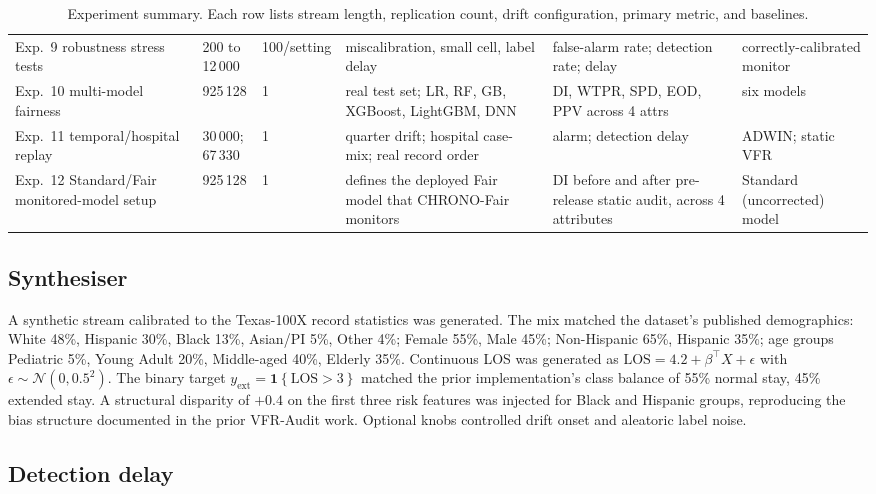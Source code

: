 \documentclass[acmsmall,nonacm,review,anonymous]{acmart}
\newcommand{\1}[1]{\mathbf{1}\!\left\{#1\right\}}
\begin{document}
\begin{table}[t]
{\begin{tabular}{p{2.4cm} p{1.5cm} p{1.6cm} p{3.4cm} p{3.7cm} p{4.6cm}}
Exp.~9 robustness stress tests & 200 to 12\,000 & 100/setting & miscalibration, small cell, label delay & false-alarm rate; detection rate; delay & correctly-calibrated monitor \\
Exp.~10 multi-model fairness & 925\,128 & 1 & real test set; LR, RF, GB, XGBoost, LightGBM, DNN & DI, WTPR, SPD, EOD, PPV across 4 attrs & six models \\
Exp.~11 temporal/hospital replay & 30\,000; 67\,330 & 1 & quarter drift; hospital case-mix; real record order & alarm; detection delay & ADWIN; static VFR \\
Exp.~12 Standard/Fair monitored-model setup & 925\,128 & 1 & defines the deployed Fair model that CHRONO-Fair monitors & DI before and after pre-release static audit, across 4 attributes & Standard (uncorrected) model \\
\bottomrule
\end{tabular}%
}
\caption{Experiment summary. Each row lists stream length, replication count, drift configuration, primary metric, and baselines.}
\label{tab:expsummary}
\end{table}

\subsection{Synthesiser}\label{sec:synth}

A synthetic stream calibrated to the Texas-100X record statistics \cite{jayaraman2022texas100x} was generated. The mix matched the dataset's published demographics: White 48\%, Hispanic 30\%, Black 13\%, Asian/PI 5\%, Other 4\%; Female 55\%, Male 45\%; Non-Hispanic 65\%, Hispanic 35\%; age groups Pediatric 5\%, Young Adult 20\%, Middle-aged 40\%, Elderly 35\%. Continuous LOS was generated as $\mathrm{LOS} = 4.2 + \beta^\top X + \epsilon$ with $\epsilon \sim \mathcal{N}(0, 0.5^2)$. The binary target $y_{\mathrm{ext}} = \1{\mathrm{LOS} > 3}$ matched the prior implementation's class balance of 55\% normal stay, 45\% extended stay. A structural disparity of $+0.4$ on the first three risk features was injected for Black and Hispanic groups, reproducing the bias structure documented in the prior VFR-Audit work. Optional knobs controlled drift onset and aleatoric label noise.

\subsection{Detection delay}\label{sec:exp_delay}
\end{document}
